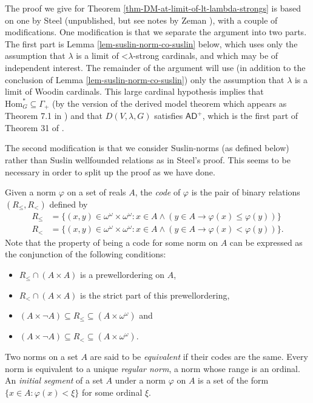 \documentclass[fleqn, 11pt]{amsart}
\theoremstyle{plain}
\theoremstyle{definition}
\theoremstyle{remark}
\newcommand{\Hom}{\mathrm{Hom}}
\newcommand{\AD}{\mathsf{AD}}
\begin{document}
The proof we give for Theorem \ref{thm-DM-at-limit-of-lt-lambda-strongs} is based on one by Steel (unpublished, but see notes by Zeman \cite[pp.~27--28]{ZemNotes}), with a couple of modifications. One modification is that we separate the argument into two parts. The first part is Lemma \ref{lem-suslin-norm-co-suslin} below, which uses only the assumption that $\lambda$ is a limit of $\mathord{<}\lambda$-strong cardinals, and which may be of independent interest. The remainder of the argument will use (in addition to the conclusion of Lemma \ref{lem-suslin-norm-co-suslin}) only the assumption that $\lambda$ is a limit of Woodin cardinals. This large cardinal hypothesis implies that  $\Hom^{*}_{G} \subseteq \Gamma_{+}$ (by the version of the derived model theorem which appears as Theorem 7.1 in \cite{SteDMT}) and that $D(V, \lambda, G)$ satisfies $\AD^{+}$, which is the first part of Theorem 31 of  \cite{WooSEMI}.

The second modification is that we consider Suslin-norms (as defined below) rather than Suslin wellfounded relations as in Steel's proof.  This seems to be necessary in order to split up the proof as we have done.




Given a norm $\varphi$ on a set of reals $A$, the \emph{code} of $\varphi$ is the pair of binary relations $(R_\le, R_<)$ defined by
\begin{align*}
 R_\le &= \{(x,y) \in \omega^\omega \times \omega^\omega : x \in A \wedge (y \in A \rightarrow \varphi(x) \le \varphi(y))\}\\
 R_<   &= \{(x,y) \in \omega^\omega \times \omega^\omega : x \in A \wedge (y \in A \rightarrow \varphi(x) < \varphi(y))\}.
\end{align*}
Note that the property of being a code for some norm on $A$ can be expressed as the conjunction of the following conditions:
 \begin{itemize}
  \item $R_\le \cap (A \times A)$ is a prewellordering on $A$,
  \item $R_< \cap (A \times A)$ is the strict part of this prewellordering,
  \item $(A \times \neg A) \subseteq R_\le \subseteq (A \times \omega^\omega)$ and
  \item $(A \times \neg A) \subseteq R_< \subseteq (A \times \omega^\omega)$.
 \end{itemize}
Two norms on a set $A$ are said to be \emph{equivalent} if their codes are the same.  Every norm is equivalent to a unique \emph{regular norm}, a norm whose range is an ordinal.
An \emph{initial segment} of a set $A$ under a norm $\varphi$ on $A$ is a set of the form $\{x \in A : \varphi(x) < \xi\}$ for some ordinal $\xi$.
\end{document}
